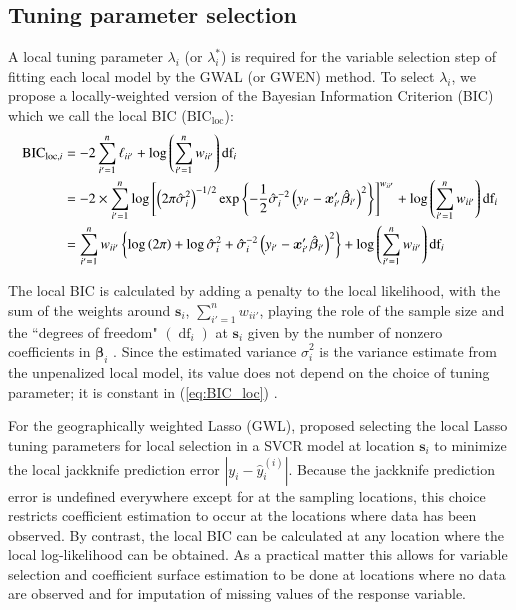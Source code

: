 \documentclass[authoryear, review, 11pt]{elsarticle}
\DeclareMathOperator*{\df}{\mbox{df}}
\begin{document}
	\subsection{Tuning parameter selection}	
	A local tuning parameter $\lambda_i$ (or $\lambda^*_i$) is required for the variable selection step of fitting each local model by the GWAL (or GWEN) method. To select $\lambda_i$, we propose a locally-weighted version of the Bayesian Information Criterion (BIC) \citep{Schwarz-1978} which we call the local BIC ($\text{BIC}_{\text{loc}}$):
	\begin{align}\label{eq:BIC_loc}
		\mbox{BIC}_{\text{loc}, i} &= -2 \sum_{i'=1}^n \ell_{ii'}  + \log \left( \sum_{i'=1}^n w_{ii'} \right) \mbox{df}_i\notag\\
		&= -2 \times \sum_{i'=1}^n \log \left[ \left(2 \pi \hat{\sigma}_i^2\right)^{-1/2} \exp \left\{-\frac{1}{2} \hat{\sigma}_i^{-2} \left(y_{i'} - \bm{x}_{i'}' \hat{\bm{\beta}}_{i'} \right)^2\right\} \right]^{w_{ii'}} + \log \left( \sum_{i'=1}^n w_{ii'} \right) \mbox{df}_i\notag\\
		&= \sum_{i'=1}^n w_{ii'} \left\{ \log \left(2 \pi \right) + \log \hat{\sigma}_i^2 + \hat{\sigma}_i^{-2} \left(y_{i'} - \bm{x}_{i'}' \hat{\bm{\beta}}_{i'} \right)^2 \right\} + \log \left( \sum_{i'=1}^n w_{ii'} \right) \mbox{df}_i
	\end{align}
	
	 The local BIC is calculated by adding a penalty to the local likelihood, with the sum of the weights around $\bm{s}_i$, $\sum_{i'=1}^n w_{ii'}$, playing the role of the sample size and the ``degrees of freedom" $\left( \df_i \right)$ at $\bm{s}_i$ given by the number of nonzero coefficients in $\bm{\beta}_i$ \citep{Zou:2007}. Since the estimated variance $\hat{\sigma}_i^2$ is the variance estimate from the unpenalized local model, its value does not depend on the choice of tuning parameter; it is constant in (\ref{eq:BIC_loc}) \citep{Zou:2007}.
	
	For the geographically weighted Lasso (GWL), \cite{Wheeler:2009} proposed selecting the local Lasso tuning parameters for local selection in a SVCR model at location $\bm{s}_i$ to minimize the local jackknife prediction error $|y_i - \hat{y}_i^{(i)}|$. Because the jackknife prediction error is undefined everywhere except for at the sampling locations, this choice restricts coefficient estimation to occur at the locations where data has been observed. By contrast, the local BIC can be calculated at any location where the local log-likelihood can be obtained. As a practical matter this allows for variable selection and coefficient surface estimation to be done at locations where no data are observed and for imputation of missing values of the response variable.
	
\end{document}
